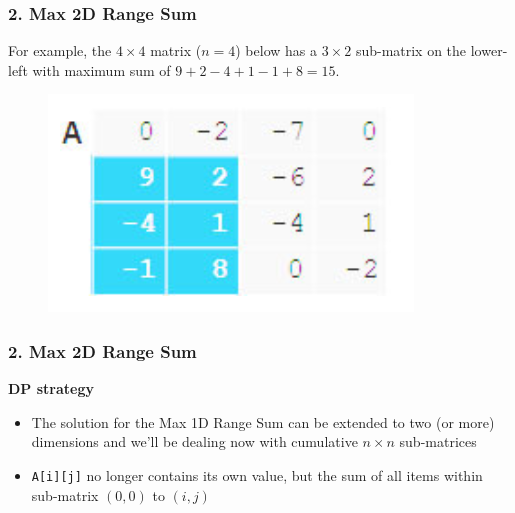\documentclass{beamer}
\begin{document}
\begin{frame}[fragile]
\frametitle{2. Max 2D Range Sum}

For example, the $4 \times 4$ matrix ($n = 4$) below has a $3 \times 2$ sub-matrix on the lower-left with maximum sum of $9 + 2 - 4 + 1 - 1 + 8 = 15$.

\begin{figure}
    \centering
    \includegraphics[scale=0.6]{imgs/max2d_1.png}
\end{figure}

\end{frame}

\begin{frame}[fragile]
\frametitle{2. Max 2D Range Sum}

\color{red}\textbf{DP strategy}\color{black} \\

\begin{itemize}
    \item The solution for the Max 1D Range Sum can be extended to two (or more) dimensions and we'll be dealing now with cumulative $n \times n$ sub-matrices
    \item \verb|A[i][j]| no longer contains its own value, but the sum of all items within sub-matrix $(0,0)$ to $(i,j)$
\end{itemize}

\end{frame}
\end{document}
